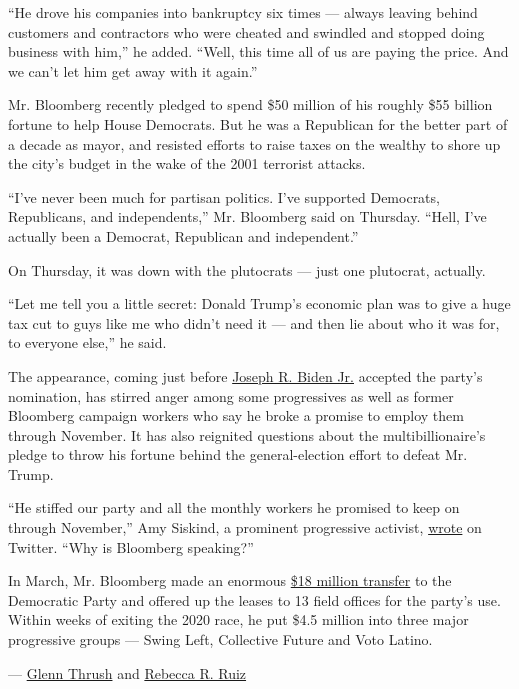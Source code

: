 ``He drove his companies into bankruptcy six times --- always leaving
behind customers and contractors who were cheated and swindled and
stopped doing business with him,'' he added. ``Well, this time all of us
are paying the price. And we can't let him get away with it again.''

Mr. Bloomberg recently pledged to spend \$50 million of his roughly \$55
billion fortune to help House Democrats. But he was a Republican for the
better part of a decade as mayor, and resisted efforts to raise taxes on
the wealthy to shore up the city's budget in the wake of the 2001
terrorist attacks.

``I've never been much for partisan politics. I've supported Democrats,
Republicans, and independents,'' Mr. Bloomberg said on Thursday. ``Hell,
I've actually been a Democrat, Republican and independent.''

On Thursday, it was down with the plutocrats --- just one plutocrat,
actually.

``Let me tell you a little secret: Donald Trump's economic plan was to
give a huge tax cut to guys like me who didn't need it --- and then lie
about who it was for, to everyone else,'' he said.

The appearance, coming just before
\href{https://www.nytimes3xbfgragh.onion/interactive/2020/us/elections/joe-biden.html}{Joseph
R. Biden Jr.} accepted the party's nomination, has stirred anger among
some progressives as well as former Bloomberg campaign workers who say
he broke a promise to employ them through November. It has also
reignited questions about the multibillionaire's pledge to throw his
fortune behind the general-election effort to defeat Mr. Trump.

``He stiffed our party and all the monthly workers he promised to keep
on through November,'' Amy Siskind, a prominent progressive activist,
\href{https://twitter.com/Amy_Siskind/status/1293968913391325185}{wrote}
on Twitter. ``Why is Bloomberg speaking?''

In March, Mr. Bloomberg made an enormous
\href{https://www.nytimes3xbfgragh.onion/2020/03/20/us/politics/michael-bloomberg-dnc.html}{\$18
million transfer} to the Democratic Party and offered up the leases to
13 field offices for the party's use. Within weeks of exiting the 2020
race, he put \$4.5 million into three major progressive groups --- Swing
Left, Collective Future and Voto Latino.

--- \href{https://www.nytimes3xbfgragh.onion/by/glenn-thrush}{Glenn
Thrush} and
\href{https://www.nytimes3xbfgragh.onion/by/rebecca-r-ruiz}{Rebecca R.
Ruiz}

